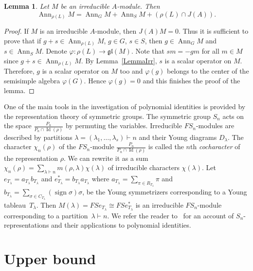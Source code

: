 \documentclass[12pt, reqno, a4paper]{amsart}
\theoremstyle{plain}
\newtheorem{lemma}{Lemma}
\theoremstyle{remark}
\theoremstyle{definition}
\begin{document}
\begin{lemma}\label{LemmaAnnGS}
Let $M$ be an irreducible $A$-module.
Then $$\operatorname{Ann}_{\rho(L)} M = \operatorname{Ann}_{G} M + \operatorname{Ann}_{S} M + (\rho(L) \cap J(A)).$$
\end{lemma}
\begin{proof}
If $M$ is an irreducible $A$-module, then
$J(A)M = 0$.
Thus it is sufficient to prove that if $g+s \in \operatorname{Ann}_{\rho(L)} M$, $g \in G$,
$s \in S$,
then $g \in \operatorname{Ann}_{G} M$ and $s \in \operatorname{Ann}_{S} M$.
 Denote $\varphi \colon {\rho(L)} \to \mathfrak{gl}(M)$.
Note that $sm=-gm$ for all $m \in M$
since $g+s \in \operatorname{Ann}_{\rho(L)} M$.
 By Lemma~\ref{LemmaIrr}, $s$ is a scalar operator on $M$.
Therefore, $g$ is a scalar operator on $M$ too and $\varphi(g)$
belongs to the center of the semisimple algebra $\varphi(G)$.
Hence $\varphi(g)=0$ and this finishes the proof of the lemma.
\end{proof}

One of the main tools in the investigation of polynomial
identities is provided by the representation theory of symmetric groups.
 The symmetric group $S_n$ acts
 on the space $\frac {P_n}{P_n \cap \operatorname{Id}(\rho)}$
  by permuting the variables.
  Irreducible $FS_n$-modules are described by partitions
  $\lambda=(\lambda_1, \ldots, \lambda_s)\vdash n$ and their
  Young diagrams $D_\lambda$.
   The character $\chi_n(\rho)$ of the
  $FS_n$-module $\frac {P_n}{P_n \cap \operatorname{Id}(\rho)}$ is called the $n$th
  \textit{cocharacter} of the representation $\rho$.
  We can rewrite it as
  a sum $\chi_n(\rho)=\sum_{\lambda\vdash n} m(\rho, \lambda) \chi(\lambda)$ of
  irreducible characters $\chi(\lambda)$.
Let  $e_{T_{\lambda}}=a_{T_{\lambda}} b_{T_{\lambda}}$
and
$e^{*}_{T_{\lambda}}=b_{T_{\lambda}} a_{T_{\lambda}}$
where
$a_{T_{\lambda}} = \sum_{\pi \in R_{T_\lambda}} \pi$
and
$b_{T_{\lambda}} = \sum_{\sigma \in C_{T_\lambda}} (\operatorname{sign} \sigma) \sigma$,
be the Young symmetrizers corresponding to a Young tableau~$T_\lambda$.
Then $M(\lambda) = FS e_{T_\lambda} \cong FS e^{*}_{T_\lambda}$
is an irreducible $FS_n$-module corresponding to a partition~$\lambda \vdash n$.
  We refer the reader to~\cite{ZaiGia, Bahturin, DrenKurs} for an account
  of $S_n$-representations and their applications to polynomial
  identities.

\section{Upper bound}
\end{document}
